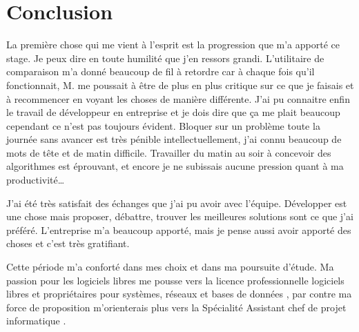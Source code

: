 \chapter{Conclusion}

La première chose qui me vient à l'esprit est la progression que m'a apporté ce
stage. Je peux dire en toute humilité que j'en ressors grandi. L'utilitaire de
comparaison m'a donné beaucoup de fil à retordre car à chaque fois qu'il
fonctionnait, M. me poussait à être de plus en plus critique sur
ce que je faisais et à recommencer en voyant les choses de manière différente.
J'ai pu connaitre enfin le travail de développeur en entreprise et je dois dire
que ça me plait beaucoup cependant ce n'est pas toujours évident. Bloquer sur
un problème toute la journée sans avancer est très pénible intellectuellement,
j'ai connu beaucoup de mots de tête et de matin difficile. Travailler du matin
au soir à concevoir des algorithmes est éprouvant, et encore je ne subissais
aucune pression quant à ma productivité\dots

J'ai été très satisfait des échanges que j'ai pu avoir avec l'équipe.
Développer est une chose mais proposer, débattre, trouver les meilleures
solutions sont ce que j'ai préféré. L'entreprise m'a beaucoup apporté, mais je
pense aussi avoir apporté des choses et c'est très gratifiant.

Cette période m'a conforté dans mes choix et dans ma poursuite d'étude. Ma
passion pour les logiciels libres me pousse vers la licence professionnelle \og
logiciels libres et propriétaires pour systèmes, réseaux et bases de données
\fg{}, par contre ma force de proposition m'orienterais plus vers la \og
Spécialité Assistant chef de projet informatique \fg{}.
